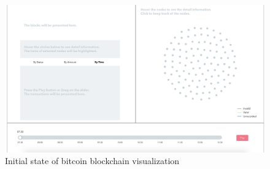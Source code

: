 \documentclass[journal, a4paper]{IEEEtran}
\begin{document}
\begin{figure}[!hbt]
		\begin{center}
		\includegraphics[width=\columnwidth]{overall_design_start.png}
		\caption{Initial state of bitcoin blockchain visualization}
		\label{fig:overall_design}
		\end{center}
	\end{figure}
\end{document}
